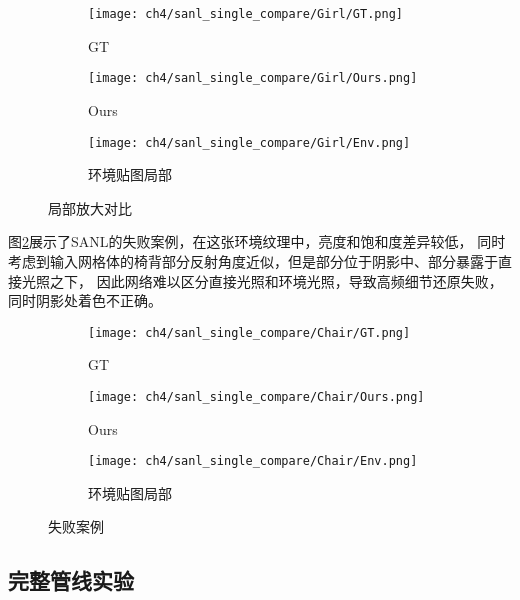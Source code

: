 \begin{figure}[H]
  \centering
  \begin{subfigure}[c]{0.23\textwidth}
    \centering
    \texttt{[image: ch4/sanl\_single\_compare/Girl/GT.png]}
    \caption{GT}
  \end{subfigure}
  \begin{subfigure}[c]{0.23\textwidth}
    \centering
    \texttt{[image: ch4/sanl\_single\_compare/Girl/Ours.png]}
    \caption{Ours}
  \end{subfigure}
  \hspace{0.05\textwidth} %
  \begin{subfigure}[c]{0.23\textwidth}
    \centering
    \texttt{[image: ch4/sanl\_single\_compare/Girl/Env.png]}
    \caption{环境贴图局部}
  \end{subfigure}
  \caption{局部放大对比}
  \label{fig:sanl_single_compare}
\end{figure}
图\ref{fig:sanl_single_compare_failure}展示了SANL的失败案例，在这张环境纹理中，亮度和饱和度差异较低，
同时考虑到输入网格体的椅背部分反射角度近似，但是部分位于阴影中、部分暴露于直接光照之下，
因此网络难以区分直接光照和环境光照，导致高频细节还原失败，同时阴影处着色不正确。

\begin{figure}[H]
  \centering
  \begin{subfigure}[c]{0.23\textwidth}
    \centering
    \texttt{[image: ch4/sanl\_single\_compare/Chair/GT.png]}
    \caption{GT}
  \end{subfigure}
  \begin{subfigure}[c]{0.23\textwidth}
    \centering
    \texttt{[image: ch4/sanl\_single\_compare/Chair/Ours.png]}
    \caption{Ours}
  \end{subfigure}
  \hspace{0.05\textwidth} %
  \begin{subfigure}[c]{0.23\textwidth}
    \centering
    \texttt{[image: ch4/sanl\_single\_compare/Chair/Env.png]}
    \caption{环境贴图局部}
  \end{subfigure}
  \caption{失败案例}
  \label{fig:sanl_single_compare_failure}
\end{figure}

\subsection{完整管线实验}

